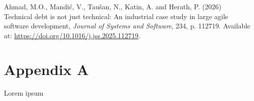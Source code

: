 \documentclass[
  11pt,
  letterpaper,
  11pt,
  english,
  onehalfspacing,
  headsepline]{MastersDoctoralThesis}
\newlength{\cslhangindent}
\newenvironment{CSLReferences}[2] %
 {\begin{list}{}{%
  \setlength{\itemindent}{0pt}
  \setlength{\leftmargin}{0pt}
  \setlength{\parsep}{0pt}
  \ifodd #1
   \setlength{\leftmargin}{\cslhangindent}
   \setlength{\itemindent}{-1\cslhangindent}
  \fi
  \setlength{\itemsep}{#2\baselineskip}}}
 {\end{list}}
\begin{document}

\label{refs}
\begin{CSLReferences}{0}{1}
Ahmad, M.O., Mandić, V., Taušan, N., Katin, A. and Herath, P. (2026)
\textquotesingle Technical debt is not just technical: {An} industrial
case study in large agile software development\textquotesingle,
\emph{Journal of Systems and Software}, 234, p. 112719. Available at:
\url{https://doi.org/10.1016/j.jss.2025.112719}.

\end{CSLReferences}

\cleardoublepage
{}
{}
\appendix

\chapter{Appendix A}\label{appendix-a}

Lorem ipsum
\end{document}
